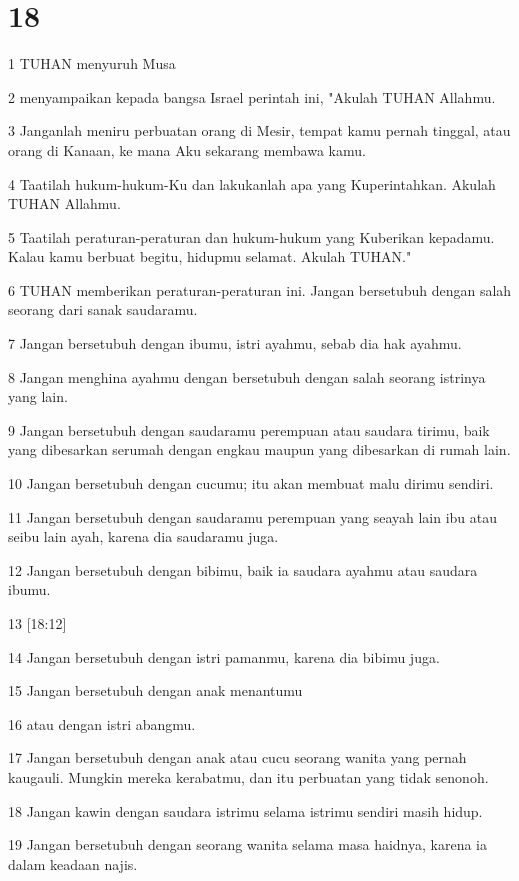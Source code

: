 \chapter{18}

\par 1 TUHAN menyuruh Musa
\par 2 menyampaikan kepada bangsa Israel perintah ini, "Akulah TUHAN Allahmu.
\par 3 Janganlah meniru perbuatan orang di Mesir, tempat kamu pernah tinggal, atau orang di Kanaan, ke mana Aku sekarang membawa kamu.
\par 4 Taatilah hukum-hukum-Ku dan lakukanlah apa yang Kuperintahkan. Akulah TUHAN Allahmu.
\par 5 Taatilah peraturan-peraturan dan hukum-hukum yang Kuberikan kepadamu. Kalau kamu berbuat begitu, hidupmu selamat. Akulah TUHAN."
\par 6 TUHAN memberikan peraturan-peraturan ini. Jangan bersetubuh dengan salah seorang dari sanak saudaramu.
\par 7 Jangan bersetubuh dengan ibumu, istri ayahmu, sebab dia hak ayahmu.
\par 8 Jangan menghina ayahmu dengan bersetubuh dengan salah seorang istrinya yang lain.
\par 9 Jangan bersetubuh dengan saudaramu perempuan atau saudara tirimu, baik yang dibesarkan serumah dengan engkau maupun yang dibesarkan di rumah lain.
\par 10 Jangan bersetubuh dengan cucumu; itu akan membuat malu dirimu sendiri.
\par 11 Jangan bersetubuh dengan saudaramu perempuan yang seayah lain ibu atau seibu lain ayah, karena dia saudaramu juga.
\par 12 Jangan bersetubuh dengan bibimu, baik ia saudara ayahmu atau saudara ibumu.
\par 13 [18:12]
\par 14 Jangan bersetubuh dengan istri pamanmu, karena dia bibimu juga.
\par 15 Jangan bersetubuh dengan anak menantumu
\par 16 atau dengan istri abangmu.
\par 17 Jangan bersetubuh dengan anak atau cucu seorang wanita yang pernah kaugauli. Mungkin mereka kerabatmu, dan itu perbuatan yang tidak senonoh.
\par 18 Jangan kawin dengan saudara istrimu selama istrimu sendiri masih hidup.
\par 19 Jangan bersetubuh dengan seorang wanita selama masa haidnya, karena ia dalam keadaan najis.
